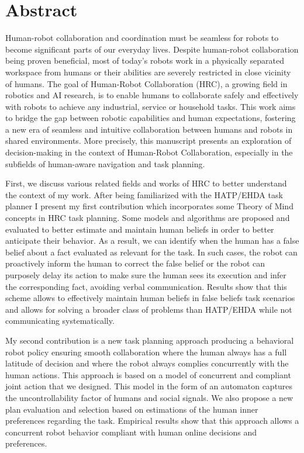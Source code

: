 \chapter*{Abstract}


Human-robot collaboration and coordination must be seamless for robots to become significant parts of our everyday lives. 
Despite human-robot collaboration being proven beneficial, most of today's robots work in a physically separated workspace from humans or their abilities are severely restricted in close vicinity of humans.
The goal of Human-Robot Collaboration (HRC), a growing field in robotics and AI research, is to enable humans to collaborate safely and effectively with robots to achieve any industrial, service or household tasks.
This work aims to bridge the gap between robotic capabilities and human expectations, fostering a new era of seamless and intuitive collaboration between humans and robots in shared environments. More precisely, this manuscript presents an exploration of decision-making in the context of Human-Robot Collaboration, especially in the subfields of human-aware navigation and task planning.

First, we discuss various related fields and works of HRC to better understand the context of my work. 
After being familiarized with the HATP/EHDA task planner I present my first contribution which incorporates some Theory of Mind concepts in HRC task planning. Some models and algorithms are proposed and evaluated to better estimate and maintain human beliefs in order to better anticipate their behavior. As a result, we can identify when the human has a false belief about a fact evaluated as relevant for the task. In such cases, the robot can proactively inform the human to correct the false belief or the robot can purposely delay its action to make sure the human sees its execution and infer the corresponding fact, avoiding verbal communication. Results show that this scheme allows to effectively maintain human beliefs in false beliefs task scenarios and allows for solving a broader class of problems than HATP/EHDA while not communicating systematically.

My second contribution is a new task planning approach producing a behavioral robot policy ensuring smooth collaboration where the human always has a full latitude of decision and where the robot always complies concurrently with the human actions.
This approach is based on a model of concurrent and compliant joint action that we designed. This model in the form of an automaton captures the uncontrollability factor of humans and social signals. We also propose a new plan evaluation and selection based on estimations of the human inner preferences regarding the task. Empirical results show that this approach allows a concurrent robot behavior compliant with human online decisions and preferences.

